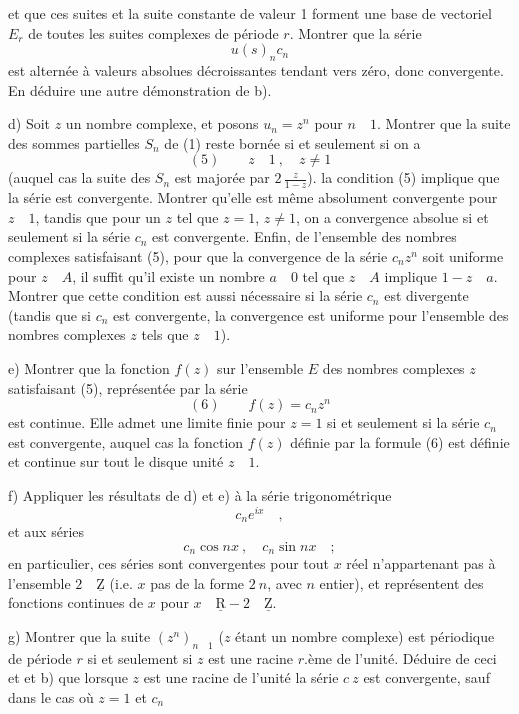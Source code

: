 et que ces suites et la suite constante de valeur 1 forment une base de  vectoriel $E_r$ de toutes les suites complexes de période $r$. Montrer que la série
\[
u(s)_n c_n
\]
est alternée à valeurs absolues décroissantes tendant vers zéro, donc convergente. En déduire une autre démonstration de b).

d) Soit $z$ un nombre complexe, et posons $u_n=z^n$ pour $n\quad1$. Montrer que la suite des sommes partielles $S_n$ de (1) reste bornée si et seulement si on a
\[
(5)\qquad z\quad1\ ,\quad z\ne1
\]
(auquel cas la suite des $S_n$ est majorée par $2\,\frac{z}{1-z}$).
 la condition (5) implique que la série  est convergente. Montrer qu'elle est même absolument convergente pour $z\quad1$, tandis que pour un $z$ tel que $z=1$, $z\ne1$, on a convergence absolue si et seulement si la  série $c_n$ est convergente. Enfin,
 de l'ensemble  des nombres complexes satisfaisant (5), pour que la convergence de la série $c_nz^n$ soit uniforme pour $z\quad A$, il suffit qu'il existe un nombre $a\quad0$ tel que $z\quad A$ implique $1-z\quad a$. Montrer que cette condition est aussi nécessaire si la série $c_n$ est divergente (tandis que si $c_n$ est convergente, la convergence est uniforme pour l'ensemble des nombres complexes $z$ tels que $z\quad1$). 

e) Montrer que la fonction $f(z)$ sur l'ensemble $E$ des nombres complexes $z$ satisfaisant (5), représentée par la série
\[
(6)\qquad f(z)=c_nz^n
\]
est continue. Elle admet une limite finie pour $z=1$ si et seulement si la  série $c_n$ est convergente, auquel cas la fonction $f(z)$ définie par la formule (6) est définie et continue  sur tout le disque unité $z\quad1$.

f) Appliquer les résultats de d) et e) à la série trigonométrique
\[
c_ne^{ix}\quad,
\]
et aux séries
\[
c_n\cos nx\ ,\quad c_n\sin nx\quad;
\]
en particulier, ces séries sont convergentes pour tout $x$ réel n'appartenant pas à l'ensemble  $2\quad\underline{\mathrm Z}$ (i.e. $x$ pas de la forme $2\ n$, avec $n$ entier), et représentent des fonctions continues de $x$ pour $x\quad\underline{\mathrm R}-2\quad\underline{\mathrm Z}$.

g) Montrer que la suite $(z^n)_{n\quad1}$ ($z$ étant un nombre complexe) est périodique de période $r$ si et seulement si $z$ est une racine $r$.ème de l'unité.  Déduire de ceci et et b) que lorsque $z$ est une racine de l'unité la série  $c\ z$ est convergente, sauf dans le cas où $z=1$ et $c_n$ 

